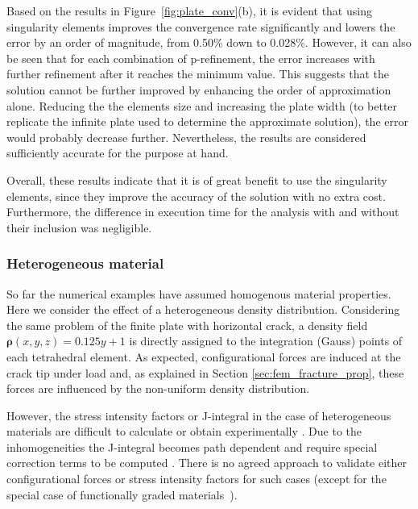 \documentclass[twocolumn]{svjour3}
\begin{document}
Based on the results in Figure~\ref{fig:plate_conv}(b), it is evident that using singularity elements improves the convergence rate significantly and lowers the error by an order of magnitude, from 0.50\% down to 0.028\%. 
However, it can also be seen that for each combination of p-refinement, the error increases with further refinement after it reaches the minimum value. 
This suggests that the solution cannot be further improved by enhancing the order of approximation alone. 
Reducing the the elements size and increasing the plate width (to better replicate the infinite plate used to determine the approximate solution), the error would probably decrease further. 
Nevertheless, the results are considered sufficiently accurate for the purpose at hand. 

Overall, these results indicate that it is of great benefit to use the singularity elements, since they improve the accuracy of the solution with no extra cost.
Furthermore, the difference in execution time for the analysis with and without their inclusion was negligible. 

\subsubsection{Heterogeneous material}
So far the numerical examples have assumed homogenous material properties. Here we consider the effect of a heterogeneous density distribution. 
Considering the same problem of the finite plate with horizontal crack, a density field $\mathbf{\rho}(x,y,z) = 0.125y + 1$ is directly assigned to the integration (Gauss) points of each tetrahedral element.
As expected, configurational forces are induced at the crack tip under load and, as explained in Section \ref{sec:fem_fracture_prop}, these forces are influenced by the non-uniform density distribution. 

However, the stress intensity factors or J-integral in the case of heterogeneous materials are difficult to calculate or obtain experimentally \citep{fischer_problems_2014}. Due to the inhomogeneities the J-integral becomes path dependent and require special correction terms to be computed \citep{eischen_fracture_1987, chang_extension_2002}. There is no agreed approach to validate either configurational forces or stress intensity factors for such cases (except for the special case of functionally graded materials~\cite{kim2002finite}).
\end{document}

